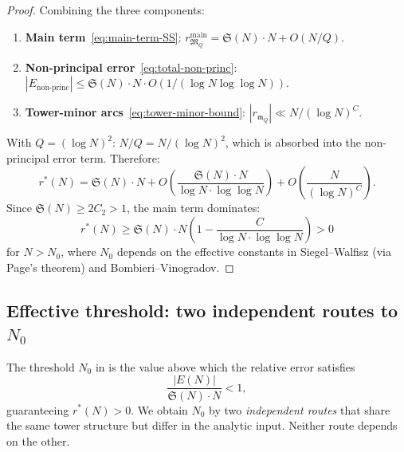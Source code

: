 \documentclass[11pt,a4paper]{article}
\theoremstyle{remark}
\newcommand{\mM}{\mathfrak{M}}
\newcommand{\mm}{\mathfrak{m}}
\begin{document}
\begin{proof}
Combining the three components:
\begin{enumerate}[nosep]
  \item \textbf{Main term}~\eqref{eq:main-term-SS}:
    $r_{\mM_Q}^{\text{main}} = \mathfrak{S}(N)\cdot N + O(N/Q)$.
  \item \textbf{Non-principal error}~\eqref{eq:total-non-princ}:
    $|E_{\text{non-princ}}| \leq \mathfrak{S}(N)\cdot N \cdot O(1/(\log N\log\log N))$.
  \item \textbf{Tower-minor arcs}~\eqref{eq:tower-minor-bound}:
    $|r_{\mm_Q}| \ll N/(\log N)^C$.
\end{enumerate}

With $Q = (\log N)^2$: $N/Q = N/(\log N)^2$, which is absorbed into the
non-principal error term.  Therefore:
\begin{equation}
  r^*(N) = \mathfrak{S}(N)\cdot N + O\!\left(\frac{\mathfrak{S}(N)\cdot N}{\log N\cdot\log\log N}\right)
    + O\!\left(\frac{N}{(\log N)^C}\right).
\end{equation}
Since $\mathfrak{S}(N) \geq 2C_2 > 1$, the main term dominates:
\begin{equation}
  r^*(N) \geq \mathfrak{S}(N)\cdot N\left(1 - \frac{C}{\log N\cdot\log\log N}\right) > 0
\end{equation}
for $N > N_0$, where $N_0$ depends on the effective constants in
Siegel--Walfisz (via Page's theorem) and Bombieri--Vinogradov.
\end{proof}

\subsection{Effective threshold: two independent routes to $N_0$}
\label{subsec:threshold}

The threshold $N_0$ in  is the value above
which the relative error satisfies
\begin{equation}
\label{eq:N0-def}
  \frac{|E(N)|}{\mathfrak{S}(N)\cdot N} < 1,
\end{equation}
guaranteeing $r^*(N) > 0$.  We obtain $N_0$ by two \emph{independent
routes} that share the same tower structure but differ in the analytic
input.  Neither route depends on the other.
\end{document}
